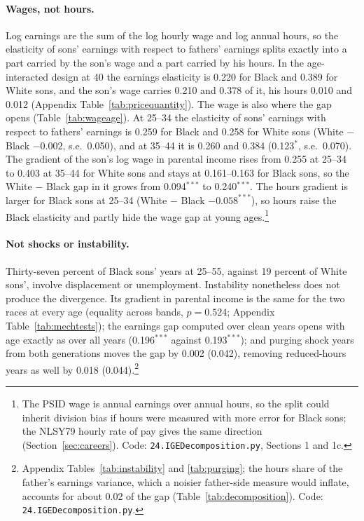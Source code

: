 \paragraph{Wages, not hours.} Log earnings are the sum of the log hourly wage and log annual hours, so the elasticity of
sons' earnings with respect to fathers' earnings splits exactly into a part carried by the son's wage and a part
carried by his hours. In the age-interacted design at 40 the earnings elasticity is 0.220 for Black and 0.389 for
White sons, and the son's wage carries 0.210 and 0.378 of it, his hours 0.010 and 0.012 (Appendix
Table~\ref{tab:pricequantity}). The wage is also where the gap opens (Table~\ref{tab:wageage}). At 25--34 the elasticity
of sons' earnings with respect to fathers' earnings is 0.259 for Black and 0.258 for White sons (White $-$ Black
$-0.002$, s.e.\ 0.050), and at 35--44 it is 0.260 and 0.384 (0.123$^{*}$, s.e.\ 0.070). The gradient of the son's log
wage in parental income rises from 0.255 at 25--34 to 0.403 at 35--44 for White sons and stays at 0.161--0.163 for
Black sons, so the White $-$ Black gap in it grows from 0.094$^{***}$ to 0.240$^{***}$. The hours gradient is larger for
Black sons at 25--34 (White $-$ Black $-0.058^{***}$), so hours raise the Black elasticity and partly hide the wage gap
at young ages.\footnote{The PSID wage is annual earnings over annual hours, so the split could inherit division bias if
hours were measured with more error for Black sons; the NLSY79 hourly rate of pay gives the same direction
(Section~\ref{sec:careers}). Code: \texttt{24.IGEDecomposition.py}, Sections 1 and 1c.}



\paragraph{Not shocks or instability.} Thirty-seven percent of Black sons' years at 25--55, against 19 percent of White
sons', involve displacement or unemployment. Instability nonetheless does not produce the divergence. Its gradient in
parental income is the same for the two races at every age (equality across bands, $p=0.524$;
Appendix Table~\ref{tab:mechtests}); the earnings gap computed over clean years opens with age exactly as over all years
(0.196$^{***}$ against 0.193$^{***}$); and purging shock years from both generations moves the gap by 0.002 (0.042),
removing reduced-hours years as well by 0.018 (0.044).\footnote{Appendix Tables~\ref{tab:instability} and
\ref{tab:purging}; the hours share of the father's earnings variance, which a noisier father-side measure would
inflate, accounts for about 0.02 of the gap (Table~\ref{tab:decomposition}). Code: \texttt{24.IGEDecomposition.py}.}

